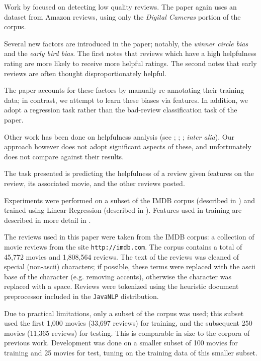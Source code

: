 \documentclass[letter,10pt]{article}
\begin{document}
Work by  focused on detecting
	low quality reviews. 
The paper again uses an dataset from Amazon reviews, using only the
	{\em Digital Cameras} portion of the corpus.

Several new factors are introduced in the paper;
	notably, the {\em winner circle bias} and the {\em early bird bias}.
The first notes that reviews which have a high helpfulness rating
	are more likely to receive more helpful ratings.
The second notes that early reviews are often thought 
	disproportionately helpful.

The paper accounts for these factors by manually re-annotating their
	training data; in contrast, we attempt to learn these biases via 
	features.
In addition, we adopt a regression task rather than the bad-review
	classification task of the paper.

Other work has been done on helpfulness analysis (see
	; ;
	; {\em inter alia}).
Our approach however does not adopt significant aspects of these,
	and unfortunately does not compare against their results.


The task presented is predicting the helpfulness of a review given
	features on the review, its associated movie, and the other reviews
	posted.

Experiments were performed on a subset of the IMDB corpus (described in
	) and trained using Linear Regression (described in
	). 
Features used in training are described in more detail in 
	.

The reviews used in this paper were taken from the IMDB corpus: a collection
	of movie reviews from the site {\tt http://imdb.com}.
The corpus contains a total of 45,772 movies and 1,808,564 reviews.
The text of the reviews was cleaned of
	special (non-ascii) characters;
	if possible, these terms were replaced with the ascii base of the character
	(e.g. removing accents), otherwise the character was replaced
	with a space.
Reviews were tokenized using the heuristic document preprocessor included
	in the {\tt JavaNLP} distribution.

Due to practical limitations, only a subset of the corpus was used;
	this subset used the first 1,000 movies (33,697 reviews) 
	for training, and the subsequent 250 movies (11,365 reviews) for testing.
This is comparable in size to the corpora of previous work.
Development was done on a smaller subset of 100 movies for training
	and 25 movies for test, tuning on the training data of this smaller
	subset.
\end{document}
